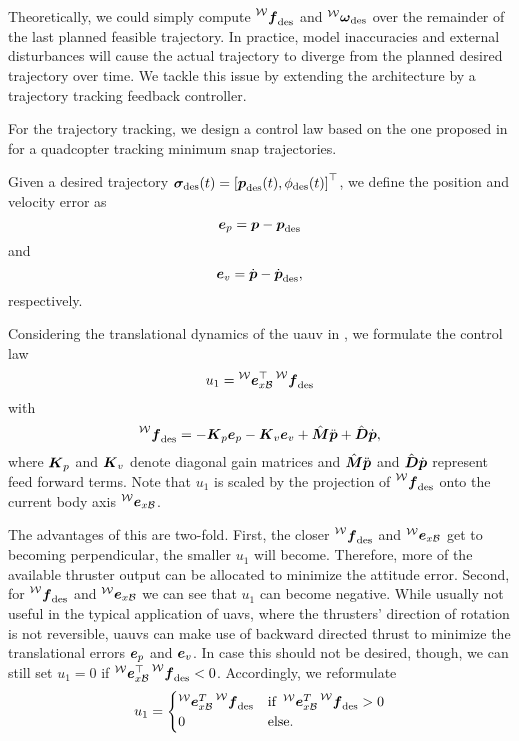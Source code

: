 Theoretically, we could simply compute $\thrustdesiredworld$ and $\vangdesiredworld$ over the remainder of the last planned feasible trajectory.
In practice, model inaccuracies and external disturbances will cause the actual trajectory to diverge from the planned desired trajectory over time.
We tackle this issue by extending the architecture by a trajectory tracking feedback controller.

For the trajectory tracking, we design a control law based on the one proposed in \cite{MellingerKumar11} for a quadcopter tracking minimum snap trajectories.

Given a desired trajectory $\bm{\sigma}_{\text{des}}(t) = \left[\mbox{$\bm{p}$}_{\text{des}}(t), \phi_{\text{des}}(t)\right]^\top$, we define the position and velocity error as
\begin{equation}
	\mbox{$\bm{e}$}_{p} = \mbox{$\bm{p}$} - \mbox{$\bm{p}$}_{\text{des}}
\end{equation}
and
\begin{equation}
	\mbox{$\bm{e}$}_{v} = \mbox{$\dot{\bm{p}}$} - \mbox{$\dot{\bm{p}}$}_{\text{des}}
	,
\end{equation}
respectively.

Considering the translational dynamics of the \ac{uauv} in , we formulate the control law
\begin{equation}
	\label{eq:translational-control-law-short}
	u_1 = \exbodyinworld^\top \thrustdesiredworld
\end{equation}
with
\begin{equation}
	\thrustdesiredworld =
	-\Kb_p \eb_p
	- \Kb_v \eb_v
	+ \hat{\bm{M}} \pbpp
	+ \hat{\bm{D}} \pbp
	,
\end{equation}
where $\mbox{$\bm{K}$}_p$ and $\mbox{$\bm{K}$}_v$ denote diagonal gain matrices and $\hat{\bm{M}} \mbox{$\ddot{\bm{p}}$}$ and $\hat{\bm{D}}\mbox{$\dot{\bm{p}}$}$ represent feed forward terms. Note that $u_1$ is scaled by the projection of $\thrustdesiredworld$ onto the current body axis $\prescript{\mathcal{W}}{}{\mbox{$\bm{e}$}}_{x\mathcal{B}}$.

The advantages of this are two-fold. First, the closer $\thrustdesiredworld$ and $\prescript{\mathcal{W}}{}{\mbox{$\bm{e}$}}_{x\mathcal{B}}$ get to becoming perpendicular, the smaller $u_1$ will become. Therefore, more of the available thruster output can be allocated to minimize the attitude error. Second, for $\thrustdesiredworld$ and $\prescript{\mathcal{W}}{}{\mbox{$\bm{e}$}}_{x\mathcal{B}}$ we can see that $u_1$ can become negative. While usually not useful in the typical application of \acp{uav}, where the thrusters' direction of rotation is not reversible, \acp{uauv} can make use of backward directed thrust to minimize the translational errors $\mbox{$\bm{e}$}_p$ and $\mbox{$\bm{e}$}_v$. In case this should not be desired, though, we can still set $u_1=0$ if $\exbodyinworld^\top \thrustdesiredworld < 0$. Accordingly, we reformulate 
\begin{equation}
	u_1 = 
	\begin{cases}
		\exbodyinworld^T \thrustdesiredworld & \text{if } \exbodyinworld^T \thrustdesiredworld > 0 \\
		0 & \text{else.}
	\end{cases}
\end{equation}

